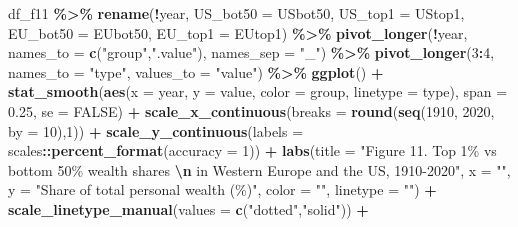 \documentclass[
  xelatex, ja=standard]{bxjsbook}
\newenvironment{Shaded}{\begin{snugshade}}{\end{snugshade}}
\newcommand{\AttributeTok}[1]{\textcolor[rgb]{0.13,0.29,0.53}{#1}}
\newcommand{\ConstantTok}[1]{\textcolor[rgb]{0.56,0.35,0.01}{#1}}
\newcommand{\DecValTok}[1]{\textcolor[rgb]{0.00,0.00,0.81}{#1}}
\newcommand{\FloatTok}[1]{\textcolor[rgb]{0.00,0.00,0.81}{#1}}
\newcommand{\FunctionTok}[1]{\textcolor[rgb]{0.13,0.29,0.53}{\textbf{#1}}}
\newcommand{\NormalTok}[1]{#1}
\newcommand{\SpecialCharTok}[1]{\textcolor[rgb]{0.81,0.36,0.00}{\textbf{#1}}}
\newcommand{\StringTok}[1]{\textcolor[rgb]{0.31,0.60,0.02}{#1}}
\theoremstyle{definition}
\theoremstyle{definition}
\theoremstyle{definition}
\theoremstyle{definition}
\theoremstyle{remark}
\begin{document}
\begin{Shaded}
\begin{Highlighting}[]
\NormalTok{df\_f11 }\SpecialCharTok{\%\textgreater{}\%} 
  \FunctionTok{rename}\NormalTok{(}\SpecialCharTok{!}\NormalTok{year, }\AttributeTok{US\_bot50 =}\NormalTok{ USbot50, }\AttributeTok{US\_top1 =}\NormalTok{ UStop1, }
         \AttributeTok{EU\_bot50 =}\NormalTok{ EUbot50, }\AttributeTok{EU\_top1 =}\NormalTok{ EUtop1) }\SpecialCharTok{\%\textgreater{}\%}
  \FunctionTok{pivot\_longer}\NormalTok{(}\SpecialCharTok{!}\NormalTok{year, }\AttributeTok{names\_to =} \FunctionTok{c}\NormalTok{(}\StringTok{"group"}\NormalTok{,}\StringTok{".value"}\NormalTok{), }\AttributeTok{names\_sep =} \StringTok{"\_"}\NormalTok{) }\SpecialCharTok{\%\textgreater{}\%}
  \FunctionTok{pivot\_longer}\NormalTok{(}\DecValTok{3}\SpecialCharTok{:}\DecValTok{4}\NormalTok{, }\AttributeTok{names\_to =} \StringTok{"type"}\NormalTok{, }\AttributeTok{values\_to =} \StringTok{"value"}\NormalTok{) }\SpecialCharTok{\%\textgreater{}\%}
  \FunctionTok{ggplot}\NormalTok{() }\SpecialCharTok{+}
  \FunctionTok{stat\_smooth}\NormalTok{(}\FunctionTok{aes}\NormalTok{(}\AttributeTok{x =}\NormalTok{ year, }\AttributeTok{y =}\NormalTok{ value, }\AttributeTok{color =}\NormalTok{ group, }\AttributeTok{linetype =}\NormalTok{ type), }
              \AttributeTok{span =} \FloatTok{0.25}\NormalTok{, }\AttributeTok{se =} \ConstantTok{FALSE}\NormalTok{) }\SpecialCharTok{+}
  \FunctionTok{scale\_x\_continuous}\NormalTok{(}\AttributeTok{breaks =} \FunctionTok{round}\NormalTok{(}\FunctionTok{seq}\NormalTok{(}\DecValTok{1910}\NormalTok{, }\DecValTok{2020}\NormalTok{, }\AttributeTok{by =} \DecValTok{10}\NormalTok{),}\DecValTok{1}\NormalTok{)) }\SpecialCharTok{+}
  \FunctionTok{scale\_y\_continuous}\NormalTok{(}\AttributeTok{labels =}\NormalTok{ scales}\SpecialCharTok{::}\FunctionTok{percent\_format}\NormalTok{(}\AttributeTok{accuracy =} \DecValTok{1}\NormalTok{)) }\SpecialCharTok{+}
  \FunctionTok{labs}\NormalTok{(}\AttributeTok{title =} \StringTok{"Figure 11. Top 1\% vs bottom 50\% wealth shares }
\StringTok{       }\SpecialCharTok{\textbackslash{}n}\StringTok{ in Western Europe and the US, 1910{-}2020"}\NormalTok{, }
       \AttributeTok{x =} \StringTok{""}\NormalTok{, }\AttributeTok{y =} \StringTok{"Share of total personal wealth (\%)"}\NormalTok{, }\AttributeTok{color =} \StringTok{""}\NormalTok{, }\AttributeTok{linetype =} \StringTok{""}\NormalTok{) }\SpecialCharTok{+}
  \FunctionTok{scale\_linetype\_manual}\NormalTok{(}\AttributeTok{values =} \FunctionTok{c}\NormalTok{(}\StringTok{"dotted"}\NormalTok{,}\StringTok{"solid"}\NormalTok{)) }\SpecialCharTok{+}

\end{Highlighting}
\end{Shaded}
\end{document}
